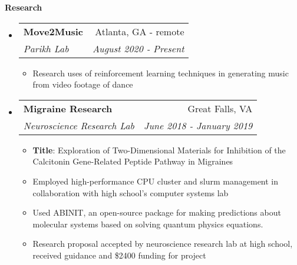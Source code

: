 \documentclass[letterpaper,10pt]{article}
\makeatletter
\newcommand{\resitem}[1]{\item #1 \vspace{-3.5pt}}
\newcommand{\resheading}[1]{{\large \colorbox{mygrey}{\begin{minipage}{\textwidth}{\textbf{#1 \vphantom{p\^{E}}}}\end{minipage}}}}
\newcommand{\ressubheading}[4]{
\begin{tabular*}{7.0in}{l@{\extracolsep{\fill}}r}
		\textbf{#1} & #2 \\
		\textit{#3} & \textit{#4} \\
\end{tabular*}\vspace{-6pt}}
\makeatother
\begin{document}

\resheading{Research}
\begin{itemize}
\item
    \ressubheading{Move2Music}{Atlanta, GA - remote}{Parikh Lab}{August 2020 - Present}
    \begin{itemize}
        \resitem{Research uses of reinforcement learning techniques in generating music from video footage of dance}
    \end{itemize}
\item
	\ressubheading{Migraine Research}{Great Falls, VA}{Neuroscience Research Lab}{June 2018 - January 2019}
	\begin{itemize}
		\resitem{\textbf{Title}: Exploration of Two-Dimensional Materials for Inhibition of the Calcitonin Gene-Related Peptide Pathway in Migraines}
	    \resitem{Employed high-performance CPU cluster and slurm management in collaboration with high school's computer systems lab}
	    \resitem{Used ABINIT, an open-source package for making predictions about molecular systems based on solving quantum physics equations.}
	    \resitem{Research proposal accepted by neuroscience research lab at high school, received guidance and \$2400 funding for project}
	\end{itemize}
	
\end{itemize}
\end{document}
